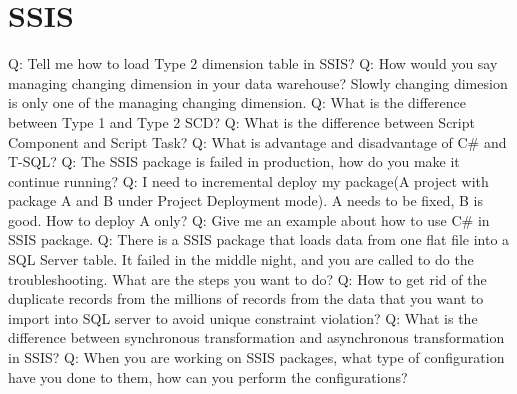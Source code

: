 \documentclass[a4paper,11pt]{article}
\begin{document}
\section{SSIS}
Q: Tell me how to load Type 2 dimension table in SSIS? \newline \newline
\noindent 
Q: How would you say managing changing dimension in your data warehouse? Slowly changing dimesion is only one of the managing changing dimension.\newline \newline
\noindent 
Q: What is the difference between Type 1 and Type 2 SCD? \newline \newline
\noindent 
Q: What is the difference between Script Component and Script Task? \newline \newline
\noindent 
Q: What is advantage and disadvantage of C\# and T-SQL? \newline \newline
\noindent 
Q: The SSIS package is failed in production, how do you make it continue running? \newline \newline
\noindent 
Q: I need to incremental deploy my package(A project with package A and B under Project Deployment mode). A needs to be fixed, B is good. How to deploy A only? \newline \newline
\noindent 
Q: Give me an example about how to use C\# in SSIS package. \newline \newline
\noindent 
Q: There is a SSIS package that loads data from one flat file into a SQL Server table. It failed in the middle night, and you are called to do the troubleshooting. What are the steps you want to do? \newline \newline
\noindent 
Q: How to get rid of the duplicate records from the millions of records from the data that you want to import into SQL server to avoid unique constraint violation? \newline \newline
\noindent 
Q: What is the difference between synchronous transformation and asynchronous transformation in SSIS? \newline \newline
\noindent 
Q: When you are working on SSIS packages, what type of configuration have you done to them, how can you perform the configurations? \newline \newline
\end{document}
